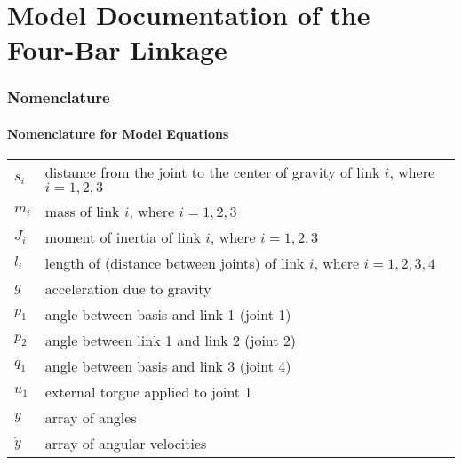 \documentclass[10pt,a4paper]{article}
\begin{document}
	\part*{Model Documentation of the \\ Four-Bar Linkage} %
	
	
	
	
	\section{Nomenclature} %
	\subsection{Nomenclature for Model Equations} %
	
	\begin{tabular}{ll}
		$s_i$ & distance from the joint to the center of gravity of link $i$, where $i = 1,2,3$ \\
		$m_i$ & mass of link $i$, where $i = 1,2,3$ \\
		$J_i$ & moment of inertia of link $i$, where $i = 1,2,3$ \\
		$l_i$ & length of (distance between joints) of link $i$, where $i = 1,2,3,4$ \\
		$g$ & acceleration due to gravity\\
		$p_1$ & angle between basis and link 1 (joint 1)\\
		$p_2$ & angle between link 1 and link 2 (joint 2)\\
		$q_1$ & angle between basis and link 3 (joint 4)\\
		$u_1$ & external torgue applied to joint 1\\
		$y$ & array of angles\\
		$\dot{y}$ & array of angular velocities\\
				
	\end{tabular}
	 
	
	\begin{tabular}{ll}

	\end{tabular}
	
\end{document}
